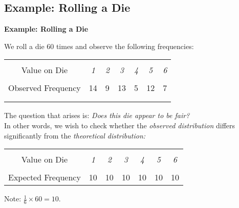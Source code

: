 \documentclass[compress]{beamer}        %
\makeatletter
\newcommand{\tcb}{\textcolor{beamer@blendedblue}}
\makeatother
\begin{document}
\subsection{Example: Rolling a Die}
\begin{frame}{\bf \tcb{Example: Rolling a Die}}


We roll a die 60 times and observe the following frequencies:\\
\begin{center}
\begin{tabular}{|c|cccccc|}
\hline
&&&&&&\\[-0.3cm]
Value on Die      & \emph{1} & \emph{2} & \emph{3} & \emph{4} & \emph{5} & \emph{6} \\[0.1cm]
\hline
&&&&&&\\[-0.3cm]
Observed Frequency & 14 & 9 & 13 & 5 & 12 & 7 \\[0.1cm]
\multicolumn{1}{c}{} & \multicolumn{1}{c}{\phantom{10}} & \multicolumn{1}{c}{\phantom{10}} & \multicolumn{1}{c}{\phantom{10}} & \multicolumn{1}{c}{\phantom{10}} & \multicolumn{1}{c}{\phantom{10}} & \multicolumn{1}{c}{\phantom{10}} \\[-0.48cm]
\hline
\multicolumn{7}{c}{}\\[-0.3cm]
\end{tabular}
\end{center}
The question that arises is: \emph{Does this die appear to be fair?}\\[0.6cm]

In other words, we wish to check whether the \emph{observed distribution} differs significantly from the \emph{theoretical distribution:}\\
\begin{center}
\begin{tabular}{|c|cccccc|}
\hline
&&&&&&\\[-0.3cm]
Value on Die      & \emph{1} & \emph{2} & \emph{3} & \emph{4} & \emph{5} & \emph{6} \\[0.1cm]
\hline
&&&&&&\\[-0.3cm]
Expected Frequency & 10 & 10 & 10 & 10 & 10 & 10 \\[0.1cm]
\hline
\end{tabular}
\end{center}

Note: $\frac{1}{6}\times60 = 10$.

\end{frame}
\end{document}
